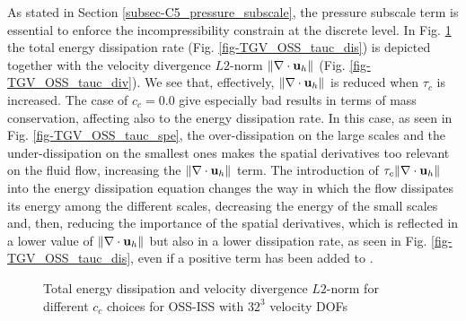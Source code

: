 As stated in Section \ref{subsec-C5_pressure_subscale}, the pressure subscale term is essential to enforce the incompressibility constrain at the discrete level. In Fig. \ref{fig-TGV_OSS_tauc_divvel} the total energy dissipation rate (Fig. \ref{fig-TGV_OSS_tauc_dis}) is depicted together with the velocity divergence $L2$-norm $\|\nabla\cdot{\bf u}_h\|$ (Fig. \ref{fig-TGV_OSS_tauc_div}). We see that, effectively, $\|\nabla\cdot{\bf u}_h\|$ is reduced when $\tau_c$ is increased. The case of $c_c=0.0$ give especially bad results in terms of mass conservation, affecting also to the energy dissipation rate. In this case, as seen in Fig. \ref{fig-TGV_OSS_tauc_spe}, the over-dissipation on the large scales and the under-dissipation on the smallest ones makes the spatial derivatives too relevant on the fluid flow, increasing the $\|\nabla\cdot{\bf u}_h\|$ term. The introduction of $\tau_c\|\nabla\cdot{\bf u}_h\|$ into the energy dissipation equation  changes the way in which the flow dissipates its energy among the different scales, decreasing the energy of the small scales and, then, reducing the importance of the spatial derivatives, which is reflected in a lower value of $\|\nabla\cdot{\bf u}_h\|$ but also in a lower dissipation rate, as seen in Fig. \ref{fig-TGV_OSS_tauc_dis}, even if a positive term has been added to .
\begin{figure}[h!]
  \centering
  \caption{Total energy dissipation and velocity divergence $L2$-norm for different $c_c$ choices for OSS-ISS with $32^3$ velocity DOFs}
  \label{fig-TGV_OSS_tauc_divvel}
\end{figure}

